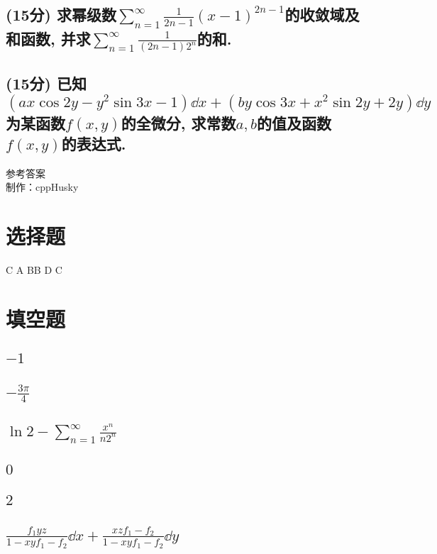\documentclass[12pt]{ctexart}
\begin{document}
\subsection{(15分) 求幂级数$\sum_{n=1}^{\infty}\frac{1}{2n-1}(x-1)^{2n-1}$的收敛域及和函数, 并求$\sum_{n=1}^{\infty}\frac{1}{(2n-1)2^{n}}$的和.}
\pagebreak
\subsection{(15分) 已知$(ax\cos{2y}-y^2\sin{3x}-1)\dd{x}+(by\cos{3x}+x^2\sin{2y}+2y)\dd{y}$为某函数$f(x,y)$的全微分, 求常数$a,b$的值及函数$f(x,y)$的表达式.}
\newpage
\begin{center}
	{\LARGE 参考答案}\\
	\vspace{1.5em}
	{\large 制作：cppHusky}
\end{center}
\setcounter{section}{0}
\section{选择题}
C A B\qquad B D C
\section{填空题}
\subsection{$-1$}
\subsection{$-\frac{3\pi}{4}$}
\subsection{$\ln{2}-\sum_{n=1}^{\infty}\frac{x^{n}}{n2^{n}}$}
\subsection{$0$}
\subsection{$2$}
\subsection{$\frac{f_1yz}{1-xyf_1-f_2}\dd{x}+\frac{xzf_1-f_2}{1-xyf_1-f_2}\dd{y}$}
\end{document}

